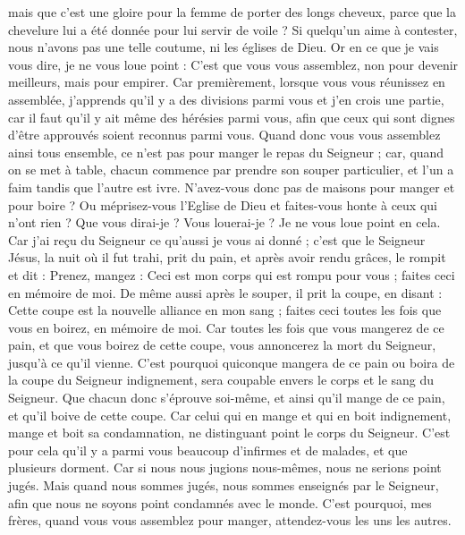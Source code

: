 \begin{multicols}{2}
mais que c’est une gloire pour la femme de porter des longs cheveux, parce que la chevelure lui a été donnée pour lui servir de voile ?
Si quelqu'un aime à contester, nous n'avons pas une telle coutume, ni les églises de Dieu.
Or en ce que je vais vous dire, je ne vous loue point : C’est que vous vous assemblez, non pour devenir meilleurs, mais pour empirer.
Car premièrement, lorsque vous vous réunissez en assemblée, j'apprends qu'il y a des divisions parmi vous et j'en crois une partie,
car il faut qu'il y ait même des hérésies parmi vous, afin que ceux qui sont dignes d’être approuvés soient reconnus parmi vous.
Quand donc vous vous assemblez ainsi tous ensemble, ce n'est pas pour manger le repas du Seigneur ;
car, quand on se met à table, chacun commence par prendre son souper particulier, et l'un a faim tandis que l'autre est ivre.
N'avez-vous donc pas de maisons pour manger et pour boire ? Ou méprisez-vous l'Eglise de Dieu et faites-vous honte à ceux qui n'ont rien ? Que vous dirai-je ? Vous louerai-je ? Je ne vous loue point en cela.
Car j'ai reçu du Seigneur ce qu'aussi je vous ai donné ; c’est que le Seigneur Jésus, la nuit où il fut trahi, prit du pain,
et après avoir rendu grâces, le rompit et dit : Prenez, mangez : Ceci est mon corps qui est rompu pour vous ; faites ceci en mémoire de moi.
De même aussi après le souper, il prit la coupe, en disant : Cette coupe est la nouvelle alliance en mon sang ; faites ceci toutes les fois que vous en boirez, en mémoire de moi.
Car toutes les fois que vous mangerez de ce pain, et que vous boirez de cette coupe, vous annoncerez la mort du Seigneur, jusqu’à ce qu'il vienne.
C'est pourquoi quiconque mangera de ce pain ou boira de la coupe du Seigneur indignement, sera coupable envers le corps et le sang du Seigneur.
Que chacun donc s'éprouve soi-même, et ainsi qu'il mange de ce pain, et qu'il boive de cette coupe.
 Car celui qui en mange et qui en boit indignement, mange et boit sa condamnation, ne distinguant point le corps du Seigneur.
C’est pour cela qu’il y a parmi vous beaucoup d’infirmes et de malades, et que plusieurs dorment.
Car si nous nous jugions nous-mêmes, nous ne serions point jugés.
Mais quand nous sommes jugés, nous sommes enseignés par le Seigneur, afin que nous ne soyons point condamnés avec le monde.
C'est pourquoi, mes frères, quand vous vous assemblez pour manger, attendez-vous les uns les autres.

\end{multicols}
